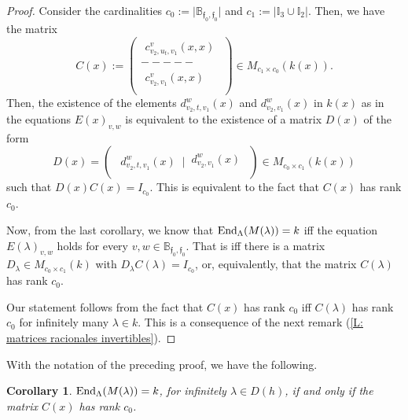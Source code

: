 \documentclass{article}
\newtheorem{corollary}[theorem]{Corollary}
\theoremstyle{definition}
\newcommand{\End}{{ \rm End }}
\renewcommand{\frak}{\mathfrak}
\newcommand{\hueca}[1]{\mathbb{#1}}
\begin{document}
\begin{proof} Consider the cardinalities  $c_0:=\vert \hueca{B}_{\frak{f}_0,\frak{f}_0}\vert $ and $c_1:=\vert \hueca{I}_3\cup \hueca{I}_2\vert$. Then, we have the matrix 
$$C(x):=\begin{pmatrix}
\begin{matrix} c^v_{v_2,u_t,v_1}(x,x)
\end{matrix}\\
-----\\
\begin{matrix}
c_{v_2,v_1}^v(x,x)\\ 
\end{matrix}
\end{pmatrix}\in M_{c_1\times c_0}(k(x)). $$
 Then, the existence of the elements $d^w_{v_2,t,v_1}(x)$ and $d^w_{v_2,v_1}(x)$ in $k(x)$ as in the equations  $E(x)_{v,w}$ is equivalent to the existence of a matrix $D(x)$ of the form 
$$D(x)=\begin{pmatrix}
\begin{matrix} d^w_{v_2,t,v_1}(x)
\end{matrix}\,\vert\,
\begin{matrix}
d_{v_2,v_1}^w(x)\\ 
\end{matrix}
\end{pmatrix}\in M_{c_0\times c_1}(k(x)) $$
 such that $D(x)C(x)=I_{c_0}$. This is equivalent to the fact that $C(x)$ has rank $c_0$. 

Now, from the last corollary, we know that  
$\End_\Lambda(M(\lambda))=k$ iff  the equation $E(\lambda)_{v,w}$ holds for every $v,w\in \hueca{B}_{\frak{f}_0,\frak{f}_0}$. That is iff  there is a  matrix $D_\lambda\in M_{c_0\times c_1}(k)$ with $D_\lambda C(\lambda)=I_{c_0}$, or, equivalently, that the matrix $C(\lambda)$ has rank $c_0$. 

Our statement follows from the fact that $C(x)$ has rank $c_0$ iff $C(\lambda)$ has rank $c_0$ for infinitely many $\lambda\in k$. This   is a consequence of the next remark (\ref{L: matrices racionales invertibles}).   
\end{proof}

With the notation of the preceding proof, we have the following. 

\begin{corollary}\label{C: caract de M(lambda) brics iff C(x) with rank c0} $\End_\Lambda(M(\lambda))=k$, for infinitely $\lambda\in D(h)$, if and only if the matrix $C(x)$ has rank $c_0$.  
\end{corollary}
\end{document}
